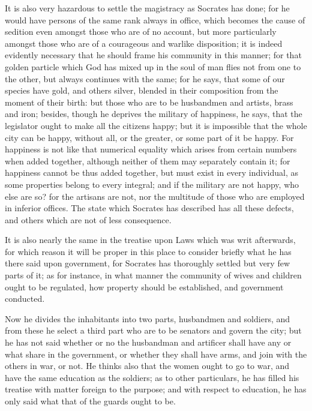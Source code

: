 It is also very hazardous to settle the magistracy as Socrates has done;
for he would have persons of the same rank always in office, which becomes
the cause of sedition even amongst those who are of no account, but more
particularly amongst those who are of a courageous and warlike
disposition; it is indeed evidently necessary that he should frame his
community in this manner; for that golden particle which God has mixed up
in the soul of man flies not from one to the other, but always continues
with the same; for he says, that some of our species have gold, and others
silver, blended in their composition from the moment of their birth: but
those who are to be husbandmen and artists, brass and iron; besides,
though he deprives the military of happiness, he says, that the legislator
ought to make all the citizens happy; but it is impossible that the whole
city can be happy, without all, or the greater, or some part of it be
happy. For happiness is not like that numerical equality which arises from
certain numbers when added together, although neither of them may
separately contain it; for happiness cannot be thus added together, but
must exist in every individual, as some properties belong to every
integral; and if the military are not happy, who else are so? for the
artisans are not, nor the multitude of those who are employed in inferior
offices. The state which Socrates has described has all these defects, and
others which are not of less consequence.


It is also nearly the same in the treatise upon Laws which was writ
afterwards, for which reason it will be proper in this place to consider
briefly what he has there said upon government, for Socrates has
thoroughly settled but very few parts of it; as for instance, in what
manner the community of wives and children ought to be regulated, how
property should be established, and government conducted.

Now he divides the inhabitants into two parts, husbandmen and soldiers,
and from these he select a third part who are to be senators and govern
the city; but he has not said whether or no the husbandman and artificer
shall have any or what share in the government, or whether they shall have
arms, and join with the others in war, or not. He thinks also that the
women ought to go to war, and have the same education as the soldiers; as
to other particulars, he has filled his treatise with matter foreign to
the purpose; and with respect to education, he has only said what that of
the guards ought to be.


